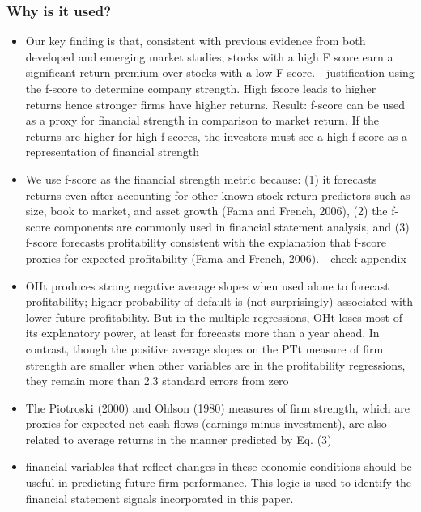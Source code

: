 \documentclass[12pt]{article}
\begin{document}
    \subsubsection{Why is it used?}

        \begin{itemize}

            \item Our key finding is that, consistent with previous evidence from both developed and emerging market studies, stocks with a high F score earn a significant return premium over stocks with a low F score. \citep{Hyde2014} - justification using the f-score to determine company strength. High fscore leads to higher returns hence stronger firms have higher returns. Result: f-score can be used as a proxy for financial strength in comparison to market return. If the returns are higher for high f-scores, the investors must see a high f-score as a representation of financial strength

            \item We use f-score as the financial strength metric because: (1) it forecasts returns even after accounting for other known stock return predictors such as size, book to market, and asset growth (Fama and French, 2006), (2) the f-score components are commonly used in financial statement analysis, and (3) f-score forecasts profitability consistent with the explanation that f-score proxies for expected profitability (Fama and French, 2006).\citep{Choi2012} - check appendix 

            \item OHt produces strong negative average slopes when used alone to forecast profitability; higher probability of default is (not surprisingly) associated with lower future profitability. But in the multiple regressions, OHt loses most of its explanatory power, at least for forecasts more than a year ahead. In contrast, though the
            positive average slopes on the PTt measure of firm strength are smaller when other variables are in the profitability regressions, they remain more than 2.3 standard errors
            from zero \citep{Fama2006}

            \item The Piotroski (2000) and Ohlson (1980) measures of firm strength, which are proxies for expected net cash flows (earnings minus investment), are also related to average returns in the manner predicted by Eq. (3) \citep{Fama2006}

            \item financial variables that reflect changes in these economic conditions should be useful in predicting future firm performance. This logic is used to identify the financial statement signals incorporated in this paper. \citep{Piotroski2000}


\end{itemize}
\end{document}
